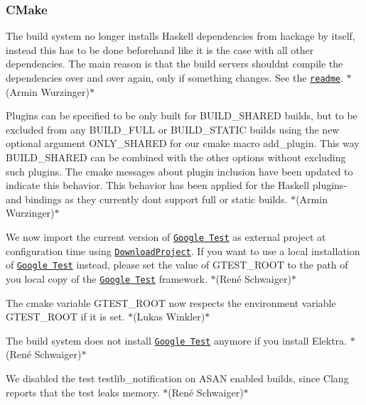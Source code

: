 \subsubsection*{C\+Make}


\begin{DoxyItemize}
\item The build system no longer installs Haskell dependencies from hackage by itself, instead this has to be done beforehand like it is the case with all other dependencies. The main reason is that the build servers shouldn\textquotesingle{}t compile the dependencies over and over again, only if something changes. See the \href{https://www.libelektra.org/bindings/haskell}{\tt readme}. $\ast$(Armin Wurzinger)$\ast$
\item Plugins can be specified to be only built for {\ttfamily B\+U\+I\+L\+D\+\_\+\+S\+H\+A\+R\+ED} builds, but to be excluded from any {\ttfamily B\+U\+I\+L\+D\+\_\+\+F\+U\+LL} or {\ttfamily B\+U\+I\+L\+D\+\_\+\+S\+T\+A\+T\+IC} builds using the new optional argument {\ttfamily O\+N\+L\+Y\+\_\+\+S\+H\+A\+R\+ED} for our cmake macro {\ttfamily add\+\_\+plugin}. This way {\ttfamily B\+U\+I\+L\+D\+\_\+\+S\+H\+A\+R\+ED} can be combined with the other options without excluding such plugins. The cmake messages about plugin inclusion have been updated to indicate this behavior. This behavior has been applied for the Haskell plugins-\/ and bindings as they currently don\textquotesingle{}t support full or static builds. $\ast$(Armin Wurzinger)$\ast$
\item We now import the current version of \href{https://github.com/google/googletest}{\tt Google Test} as external project at configuration time using \href{https://github.com/Crascit/DownloadProject}{\tt Download\+Project}. If you want to use a local installation of \href{https://github.com/google/googletest}{\tt Google Test} instead, please set the value of {\ttfamily G\+T\+E\+S\+T\+\_\+\+R\+O\+OT} to the path of you local copy of the \href{https://github.com/google/googletest}{\tt Google Test} framework. $\ast$(René Schwaiger)$\ast$
\item The cmake variable {\ttfamily G\+T\+E\+S\+T\+\_\+\+R\+O\+OT} now respects the environment variable {\ttfamily G\+T\+E\+S\+T\+\_\+\+R\+O\+OT} if it is set. $\ast$(Lukas Winkler)$\ast$
\item The build system does not install \href{https://github.com/google/googletest}{\tt Google Test} anymore if you install Elektra. $\ast$(René Schwaiger)$\ast$
\item We disabled the test {\ttfamily testlib\+\_\+notification} on A\+S\+AN enabled builds, since Clang reports that the test leaks memory. $\ast$(René Schwaiger)$\ast$

\end{DoxyItemize}
